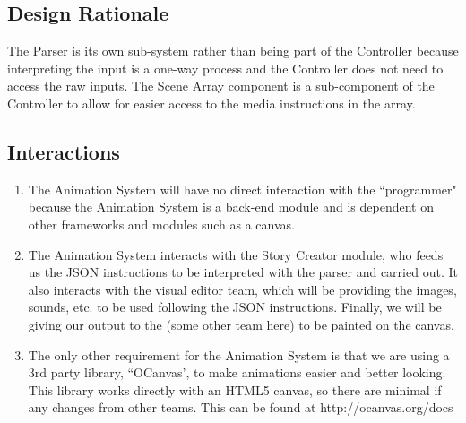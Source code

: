 \documentclass[12pt]{article}
\begin{document}
\begin{enumerate}
\noindent\subsection{Design Rationale}
The Parser is its own sub-system rather than being part of the Controller because interpreting the input is a one-way process and the Controller does not need to access the raw inputs. The Scene Array component is a sub-component of the Controller to allow for easier access to the media instructions in the array.


\noindent\subsection {Interactions}
\begin{enumerate}
\item The Animation System will have no direct interaction with the ``programmer" because the Animation System is a back-end module and is dependent on other frameworks and modules such as a canvas.
\item The Animation System interacts with the Story Creator module, who feeds us the JSON instructions to be interpreted with the parser and carried out. It also interacts with the visual editor team, which will be providing the images, sounds, etc. to be used following the JSON instructions. Finally, we will be giving our output to the (some other team here) to be painted on the canvas.
\item The only other requirement for the Animation System is that we are using a 3rd party library, ``OCanvas', to make animations easier and better looking. This library works directly with an HTML5 canvas, so there are minimal if any changes from other teams. This can be found at http://ocanvas.org/docs

\end{enumerate}



\end{enumerate}
\end{document}
